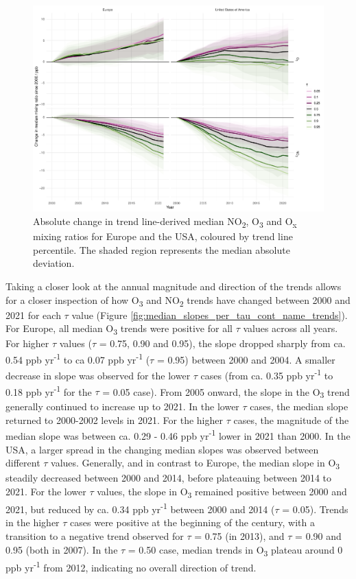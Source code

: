 \documentclass[journal abbreviation, manuscript]{copernicus}
\begin{document}
\begin{figure}[h!]
\includegraphics[width=12cm]{figures/f7_cusum.pdf}
\caption{Absolute change in trend line-derived median NO\textsubscript{2}, O\textsubscript{3} and O\textsubscript{x} mixing ratios for Europe and the USA, coloured by trend line percentile. The shaded region represents the median absolute deviation.}
\label{fig:median_slopes_per_tau_cont_name_absolute}
\end{figure}

Taking a closer look at the annual magnitude and direction of the trends allows for a closer inspection of how O\textsubscript{3} and NO\textsubscript{2} trends have changed between 2000 and 2021 for each $\tau$ value (Figure \ref{fig:median_slopes_per_tau_cont_name_trends}). For Europe, all median O\textsubscript{3} trends were positive for all $\tau$ values across all years. For higher $\tau$ values ($\tau$ = 0.75, 0.90 and 0.95), the slope dropped sharply from ca. 0.54 ppb yr\textsuperscript{-1} to ca 0.07 ppb yr\textsuperscript{-1} ($\tau$ = 0.95) between 2000 and 2004. A smaller decrease in slope was observed for the lower $\tau$ cases (from ca. 0.35 ppb yr\textsuperscript{-1} to 0.18 ppb yr\textsuperscript{-1} for the $\tau$ = 0.05 case). From 2005 onward, the slope in the O\textsubscript{3} trend generally continued to increase up to 2021. In the lower $\tau$ cases, the median slope returned to 2000-2002 levels in 2021. For the higher $\tau$ cases, the magnitude of the median slope was between ca. 0.29 - 0.46 ppb yr\textsuperscript{-1} lower in 2021 than 2000. In the USA, a larger spread in the changing median slopes was observed between different $\tau$ values. Generally, and in contrast to Europe, the median slope in O\textsubscript{3} steadily decreased between 2000 and 2014, before plateauing between 2014 to 2021. For the lower $\tau$ values, the slope in O\textsubscript{3} remained positive between 2000 and 2021, but reduced by ca. 0.34 ppb yr\textsuperscript{-1} between 2000 and 2014 ($\tau$ = 0.05). Trends in the higher $\tau$ cases were positive at the beginning of the century, with a transition to a negative trend observed for $\tau$ = 0.75 (in 2013), and $\tau$ = 0.90 and 0.95 (both in 2007). In the $\tau$ = 0.50 case, median trends in O\textsubscript{3} plateau around 0 ppb yr\textsuperscript{-1} from 2012, indicating no overall direction of trend.
\end{document}
